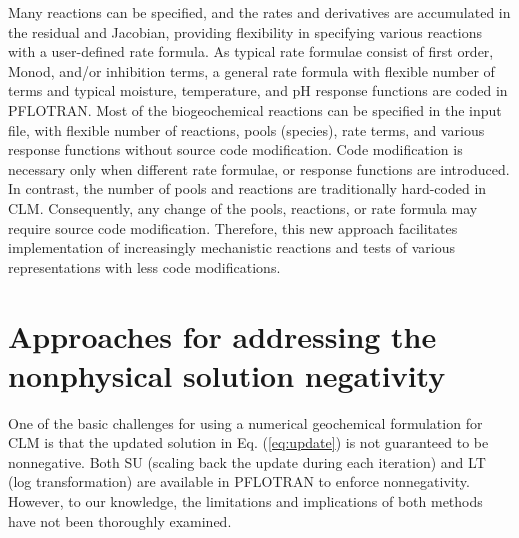 \documentclass[gmd, manuscript]{copernicus}
\begin{document}
Many reactions can be
specified, and the rates and derivatives are accumulated in the residual and
Jacobian, providing flexibility in specifying various reactions with
a user-defined rate formula. As typical rate formulae consist of first order,
Monod, and/or inhibition terms, a general rate formula with flexible
number of terms and typical moisture, temperature, and pH response functions
are coded in PFLOTRAN. Most of the biogeochemical reactions can be specified in
the input file, with flexible number of reactions, pools (species), rate terms,
and various response functions without source code modification. Code
modification is necessary only when different rate formulae, or response
functions are introduced.
In contrast, the number of pools and reactions
are traditionally hard-coded in CLM. Consequently, any change of the pools,
reactions, or rate formula may require source code modification. Therefore, this
new approach facilitates implementation of increasingly mechanistic reactions
and tests of various representations with less code modifications.

%

\section{Approaches for addressing the nonphysical solution negativity}
One of the basic challenges for using a numerical geochemical formulation
for CLM is that the updated solution in Eq. (\ref{eq:update}) is not guaranteed to be nonnegative. 
Both SU (scaling back the update during each iteration) and LT (log
transformation) are available in PFLOTRAN  to enforce nonnegativity. 
However, to our knowledge, the limitations and implications of both methods have
not been thoroughly examined.  
\end{document}
